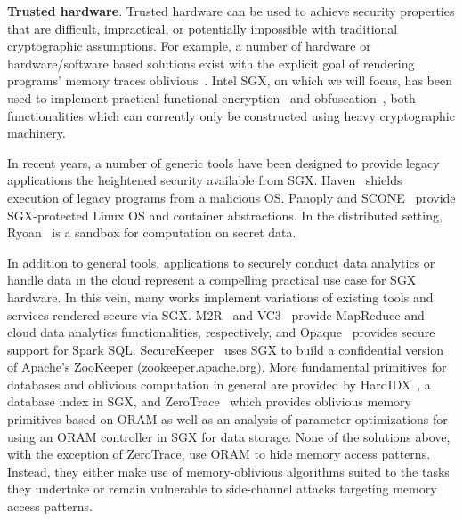 \documentclass[letterpaper,twocolumn,10pt]{article}
\begin{document}
  \noindent \textbf{Trusted hardware}. 
Trusted hardware can be used to achieve security properties that are difficult, impractical, or potentially impossible with traditional cryptographic assumptions. For example, a number of hardware or hardware/software based solutions exist with the explicit goal of rendering programs' memory traces oblivious~\cite{CLD16, LHM+15, MLS+13}. Intel SGX, on which we will focus, has been used to implement practical functional encryption~\cite{FVBG16} and obfuscation~\cite{NFR+17}, both functionalities which can currently only be constructed using heavy cryptographic machinery.

In recent years, a number of generic tools have been designed to provide legacy applications the heightened security available from SGX. Haven~\cite{BPH15} shields execution of legacy programs from a malicious OS. Panoply and SCONE~\cite{STTS17, ATG+16} provide SGX-protected Linux OS and container abstractions. In the distributed setting, Ryoan~\cite{HZX+16} is a sandbox for computation on secret data. 

In addition to general tools, applications to securely conduct data analytics or handle data in the cloud represent a compelling practical use case for SGX hardware. In this vein, many works implement variations of existing tools and services rendered secure via SGX. M2R~\cite{DSC+15} and VC3~\cite{SCF+15} provide MapReduce and cloud data analytics functionalities, respectively, and Opaque~\cite{ZDB+17} provides secure support for Spark SQL. SecureKeeper~\cite{BWG+16} uses SGX to build a confidential version of Apache's ZooKeeper (\url{zookeeper.apache.org}). More fundamental primitives for databases and oblivious computation in general are provided by HardIDX~\cite{FBB+17}, a database index in SGX, and ZeroTrace~\cite{SGF17} which provides oblivious memory primitives based on ORAM as well as an analysis of parameter optimizations for using an ORAM controller in SGX for data storage. None of the solutions above, with the exception of ZeroTrace, use ORAM to hide memory access patterns. Instead, they either make use of memory-oblivious algorithms suited to the tasks they undertake or remain vulnerable to side-channel attacks targeting memory access patterns. 
\end{document}
